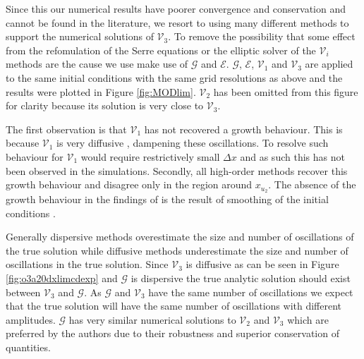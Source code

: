 \documentclass[times]{elsarticle}
\begin{document}
Since this our numerical results have poorer convergence and conservation and cannot be found in the literature, we resort to using many different methods to support the numerical solutions of $\mathcal{V}_3$. To remove the possibility that some effect from the refomulation of the Serre equations or the elliptic solver of the $\mathcal{V}_i$ methods are the cause we use make use of $\mathcal{G}$ and $\mathcal{E}$. $\mathcal{G}$, $\mathcal{E}$, $\mathcal{V}_1$ and $\mathcal{V}_3$ are applied to the same initial conditions with the same grid resolutions as above and the results were plotted in Figure \ref{fig:MODlim}. $\mathcal{V}_2$ has been omitted from this figure for clarity because its solution is very close to $\mathcal{V}_3$. 

The first observation is that $\mathcal{V}_1$ has not recovered a growth behaviour. This is because $\mathcal{V}_1$ is very diffusive \cite{Zoppou-etal-2017}, dampening these oscillations. To resolve such behaviour for $\mathcal{V}_1$ would require restrictively small $\Delta x$ and as such this has not been observed in the simulations. Secondly, all high-order methods recover this growth behaviour and disagree only in the region around $x_{u_2}$. The absence of the growth behaviour in the findings of \citet{El-etal-2006} is the result of smoothing of the initial conditions \cite{El-Hoefer-2016-11}.

Generally dispersive methods overestimate the size and number of oscillations of the true solution while diffusive methods underestimate the size and number of oscillations in the true solution. Since $\mathcal{V}_3$ is diffusive as can be seen in Figure \ref{fig:o3a20dxlimcdexp} and $\mathcal{G}$ is dispersive the true analytic solution should exist between $\mathcal{V}_3$ and $\mathcal{G}$. As $\mathcal{G}$ and $\mathcal{V}_3$ have the same number of oscillations we expect that the true solution will have the same number of oscillations with different amplitudes. $\mathcal{G}$ has very similar numerical solutions to $\mathcal{V}_2$ and $\mathcal{V}_3$  which are preferred by the authors due to their robustness and superior conservation of quantities. 
\end{document}

